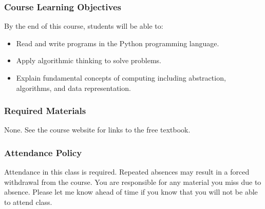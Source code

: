 \documentclass[10pt]{article}
\begin{document}
\subsubsection*{Course Learning Objectives}


By the end of this course, students will be able to:

\begin{itemize}
\item Read and write programs in the Python programming language.
\item Apply algorithmic thinking to solve problems.  
\item Explain fundamental concepts of computing including abstraction, algorithms, and data representation. 
\end{itemize}

\subsubsection*{Required Materials}

None. See the course website for links to the free textbook.

%
\subsubsection*{Attendance Policy}

Attendance in this class is required. Repeated absences may result in a forced withdrawal from the course. You are responsible for any material you miss due to absence. Please let me know ahead of time if you know that you will not be able to attend class.
\end{document}
